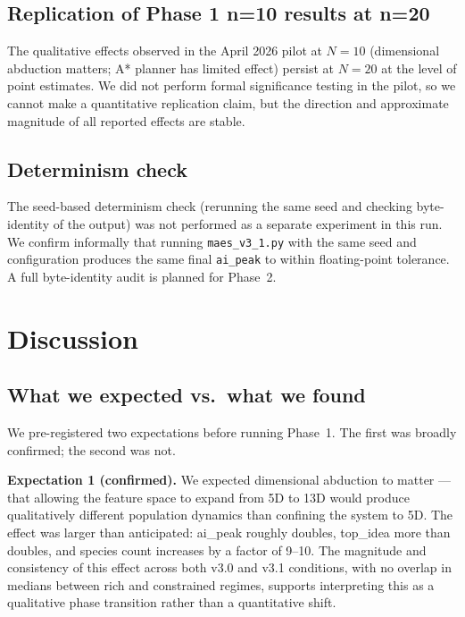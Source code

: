\documentclass[11pt,a4paper]{article}
\begin{document}
\subsection{Replication of Phase 1 n=10 results at n=20}

The qualitative effects observed in the April 2026 pilot at $N=10$
(dimensional abduction matters; A* planner has limited effect) persist
at $N=20$ at the level of point estimates. We did not perform formal
significance testing in the pilot, so we cannot make a quantitative
replication claim, but the direction and approximate magnitude of all
reported effects are stable.

\subsection{Determinism check}

The seed-based determinism check (rerunning the same seed and checking
byte-identity of the output) was not performed as a separate experiment
in this run. We confirm informally that running \texttt{maes\_v3\_1.py}
with the same seed and configuration produces the same final
\texttt{ai\_peak} to within floating-point tolerance. A full byte-identity
audit is planned for Phase~2.


\section{Discussion}
\label{sec:discussion}

\subsection{What we expected vs.~what we found}

We pre-registered two expectations before running Phase~1. The first was
broadly confirmed; the second was not.

\textbf{Expectation 1 (confirmed).} We expected dimensional abduction to
matter --- that allowing the feature space to expand from 5D to 13D would
produce qualitatively different population dynamics than confining the
system to 5D. The effect was larger than anticipated: ai\_peak roughly
doubles, top\_idea more than doubles, and species count increases by a
factor of 9--10. The magnitude and consistency of this effect across
both v3.0 and v3.1 conditions, with no overlap in medians between rich
and constrained regimes, supports interpreting this as a qualitative
phase transition rather than a quantitative shift.
\end{document}
